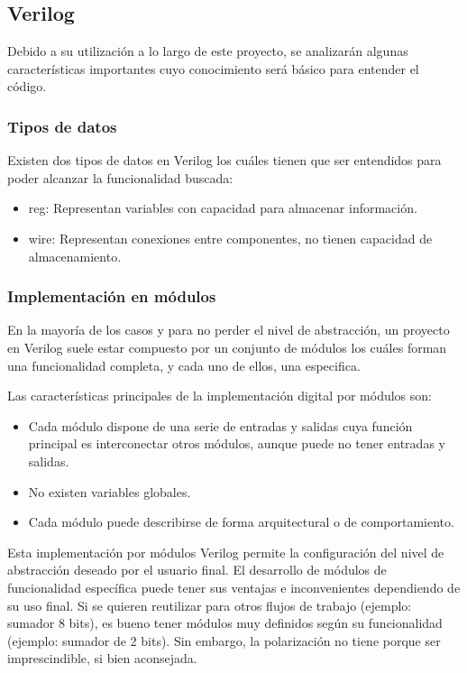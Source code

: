 \subsection{Verilog}\label{sec:Verilog}
Debido a su utilización a lo largo de este proyecto, se analizarán algunas características importantes cuyo conocimiento será básico para entender el código.

\subsubsection{Tipos de datos}

Existen dos tipos de datos en Verilog los cuáles tienen que ser entendidos para poder alcanzar la funcionalidad buscada:
\begin{itemize}
	\item reg: Representan variables con capacidad para almacenar información.
	\item wire: Representan conexiones entre componentes, no tienen capacidad de almacenamiento.
\end{itemize}

\subsubsection{Implementación en módulos}
En la mayoría de los casos y para no perder el nivel de abstracción, un proyecto en Verilog suele estar compuesto por un conjunto de módulos los cuáles forman una funcionalidad completa, y cada uno de ellos, una especifica. \newline

Las características principales de la implementación digital por módulos son:
\begin{itemize}
	\item Cada módulo dispone de una serie de entradas y salidas cuya función principal es interconectar otros módulos, aunque puede no tener entradas y salidas.
	\item No existen variables globales.
	\item Cada módulo puede describirse de forma arquitectural o de comportamiento.
\end{itemize}

Esta implementación por módulos Verilog permite la configuración del nivel de abstracción deseado por el usuario final. \newline
El desarrollo de módulos de funcionalidad específica puede tener sus ventajas e inconvenientes dependiendo de su uso final. \newline
Si se quieren reutilizar para otros flujos de trabajo (ejemplo: sumador 8 bits), es bueno tener módulos muy definidos según su funcionalidad (ejemplo: sumador de 2 bits). Sin embargo, la polarización no tiene porque ser imprescindible, si bien aconsejada.

